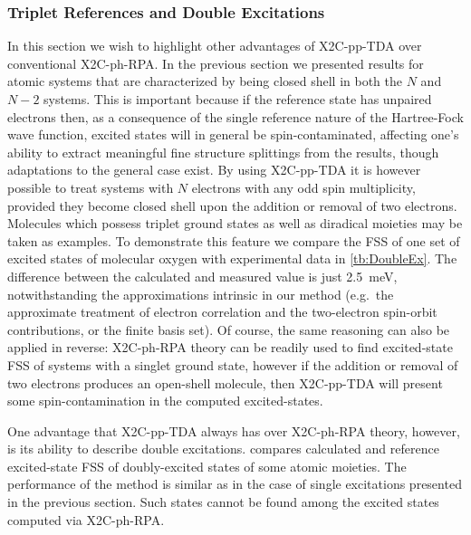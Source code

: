 \subsubsection{Triplet References and Double Excitations}
\label{subsec:DoubleEx}
In this section we wish to highlight other advantages of X2C-pp-TDA over conventional X2C-ph-RPA.
In the previous section we presented results for atomic systems that are characterized by being closed shell in both the $N$ and $N-2$ systems.
This is important because if the reference state has unpaired electrons then, as a consequence of the single reference nature of the Hartree-Fock wave function,
excited states will in general be spin-contaminated, affecting one's ability to extract meaningful fine structure splittings from the results, though adaptations to the general case exist.\cite{Liu10_064106,Suo11_134101,Liu11_194106,Liu12_024107,Liu13_3741}
By using X2C-pp-TDA it is however possible to treat systems with $N$ electrons with any odd spin multiplicity, provided they become closed shell upon the addition or removal of two electrons.
Molecules which possess triplet ground states as well as diradical moieties may be taken as examples.
To demonstrate this feature we compare the FSS of one set of excited states of molecular oxygen with experimental data in \cref{tb:DoubleEx}.
The difference between the calculated and measured value is just 2.5~meV, notwithstanding the approximations intrinsic in our method (e.g.~the approximate treatment of electron correlation and the two-electron spin-orbit contributions, or the finite basis set).
Of course, the same reasoning can also be applied in reverse: X2C-ph-RPA theory can be readily used to find excited-state FSS of systems with a singlet ground state, however if the addition or removal of two electrons produces an open-shell molecule, then X2C-pp-TDA will present some spin-contamination in the computed excited-states.



One advantage that X2C-pp-TDA always has over X2C-ph-RPA theory, however, is its ability to describe double excitations.
 compares calculated and reference excited-state FSS of doubly-excited states of some atomic moieties.
The performance of the method is similar as in the case of single excitations presented in the previous section.
Such states cannot be found among the excited states computed via X2C-ph-RPA.

